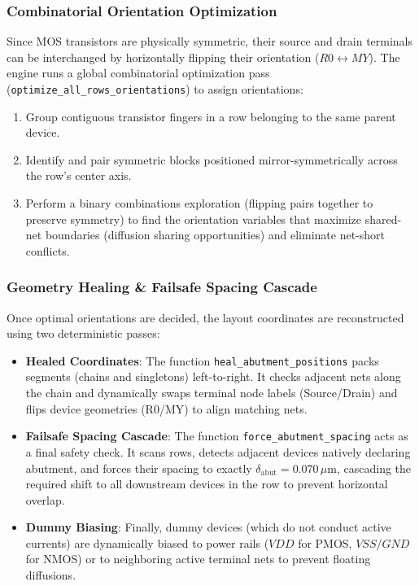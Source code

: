 \subsubsection{Combinatorial Orientation Optimization}
Since MOS transistors are physically symmetric, their source and drain terminals can be interchanged by horizontally flipping their orientation ($R0 \leftrightarrow MY$). The engine runs a global combinatorial optimization pass (\texttt{optimize\_}\allowbreak\texttt{all\_}\allowbreak\texttt{rows\_}\allowbreak\texttt{orientations}) to assign orientations:
\begin{enumerate}
    \item Group contiguous transistor fingers in a row belonging to the same parent device.
    \item Identify and pair symmetric blocks positioned mirror-symmetrically across the row's center axis.
    \item Perform a binary combinations exploration (flipping pairs together to preserve symmetry) to find the orientation variables that maximize shared-net boundaries (diffusion sharing opportunities) and eliminate net-short conflicts.
\end{enumerate}

\subsubsection{Geometry Healing \& Failsafe Spacing Cascade}
Once optimal orientations are decided, the layout coordinates are reconstructed using two deterministic passes:
\begin{itemize}
    \item \textbf{Healed Coordinates}: The function \texttt{heal\_}\allowbreak\texttt{abutment\_}\allowbreak\texttt{positions} packs segments (chains and singletons) left-to-right. It checks adjacent nets along the chain and dynamically swaps terminal node labels (Source/Drain) and flips device geometries (R0/MY) to align matching nets.
    \item \textbf{Failsafe Spacing Cascade}: The function \texttt{force\_}\allowbreak\texttt{abutment\_}\allowbreak\texttt{spacing} acts as a final safety check. It scans rows, detects adjacent devices natively declaring abutment, and forces their spacing to exactly $\delta_{\text{abut}} = 0.070\,\mu\text{m}$, cascading the required shift to all downstream devices in the row to prevent horizontal overlap.
    \item \textbf{Dummy Biasing}: Finally, dummy devices (which do not conduct active currents) are dynamically biased to power rails ($VDD$ for PMOS, $VSS/GND$ for NMOS) or to neighboring active terminal nets to prevent floating diffusions.
\end{itemize}

